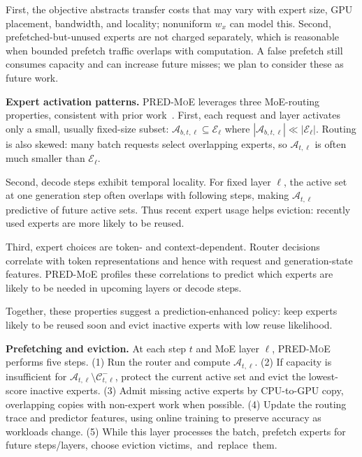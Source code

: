 \documentclass[sigconf]{acmart}
\newcommand{\sysname}{\textsc{PRED-MoE}\xspace}
\newcommand{\sys}{\sysname}
\begin{document}
First, the objective abstracts transfer costs that may vary with expert size, GPU placement, bandwidth, and locality; nonuniform $w_x$ can model this. Second, prefetched-but-unused experts are not charged separately, which is reasonable when bounded prefetch traffic overlaps with computation. A false prefetch still consumes capacity and can increase future misses; we plan to consider these as future work.

\textbf{Expert activation patterns.}\label{sec:expert_activation_patterns}
%
\sys leverages three MoE-routing properties, consistent with prior work~\cite{wang2025harnessing, zhou2022mixture}. First, each request and layer activates only a small, usually fixed-size subset: $\mathcal{A}_{b,t,\ell}\subseteq \mathcal{E}_\ell$ where $|\mathcal{A}_{b,t,\ell}| \ll |\mathcal{E}_\ell|$. Routing is also skewed: many batch requests select overlapping experts, so $\mathcal{A}_{t,\ell}$ is often much smaller than $\mathcal{E}_\ell$.

Second, decode steps exhibit temporal locality. For fixed layer $\ell$, the active set at one generation step often overlaps with following steps, making $\mathcal{A}_{t,\ell}$ predictive of future active sets. Thus recent expert usage helps eviction: recently used experts are more likely to be reused.

Third, expert choices are token- and context-dependent. Router decisions correlate with token representations and hence with request and generation-state features. \sys profiles these correlations to predict which experts are likely to be needed in upcoming layers or decode steps.

Together, these properties suggest a prediction-enhanced policy: keep experts likely to be reused soon and evict inactive experts with low reuse likelihood.

\textbf{Prefetching and eviction.}
%
At each step $t$ and MoE layer $\ell$, \sys performs five steps. (1) Run the router and compute $\mathcal{A}_{t,\ell}$. (2) If capacity is insufficient for $\mathcal{A}_{t,\ell}\setminus \mathcal{C}^{-}_{t,\ell}$, protect the current active set and evict the lowest-score inactive experts. (3) Admit missing active experts by CPU-to-GPU copy, overlapping copies with non-expert work when possible. (4) Update the routing trace and predictor features, using online training to preserve accuracy as workloads change. (5) While this layer processes the batch, prefetch experts for future steps/layers, choose eviction \mbox{victims, and replace them.}
\end{document}
